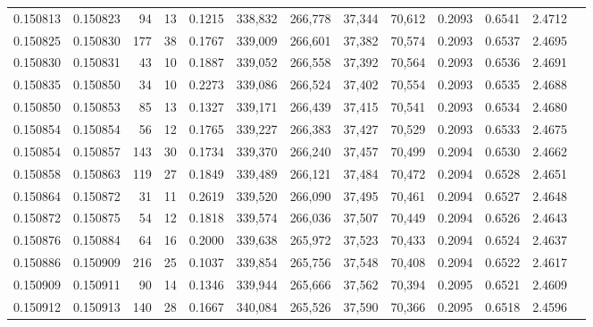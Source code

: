 \begin{tabular}{rrrrrrrrrrrrr}
0.150813 & 0.150823 &    94 &  13 &                                     0.1215 & 338,832 & 266,778 &  37,344 &  70,612 & 0.2093 & 0.6541 & 2.4712 \\
0.150825 & 0.150830 &   177 &  38 &                                     0.1767 & 339,009 & 266,601 &  37,382 &  70,574 & 0.2093 & 0.6537 & 2.4695 \\
0.150830 & 0.150831 &    43 &  10 &                                     0.1887 & 339,052 & 266,558 &  37,392 &  70,564 & 0.2093 & 0.6536 & 2.4691 \\
0.150835 & 0.150850 &    34 &  10 &                                     0.2273 & 339,086 & 266,524 &  37,402 &  70,554 & 0.2093 & 0.6535 & 2.4688 \\
0.150850 & 0.150853 &    85 &  13 &                                     0.1327 & 339,171 & 266,439 &  37,415 &  70,541 & 0.2093 & 0.6534 & 2.4680 \\
0.150854 & 0.150854 &    56 &  12 &                                     0.1765 & 339,227 & 266,383 &  37,427 &  70,529 & 0.2093 & 0.6533 & 2.4675 \\
0.150854 & 0.150857 &   143 &  30 &                                     0.1734 & 339,370 & 266,240 &  37,457 &  70,499 & 0.2094 & 0.6530 & 2.4662 \\
0.150858 & 0.150863 &   119 &  27 &                                     0.1849 & 339,489 & 266,121 &  37,484 &  70,472 & 0.2094 & 0.6528 & 2.4651 \\
0.150864 & 0.150872 &    31 &  11 &                                     0.2619 & 339,520 & 266,090 &  37,495 &  70,461 & 0.2094 & 0.6527 & 2.4648 \\
0.150872 & 0.150875 &    54 &  12 &                                     0.1818 & 339,574 & 266,036 &  37,507 &  70,449 & 0.2094 & 0.6526 & 2.4643 \\
0.150876 & 0.150884 &    64 &  16 &                                     0.2000 & 339,638 & 265,972 &  37,523 &  70,433 & 0.2094 & 0.6524 & 2.4637 \\
0.150886 & 0.150909 &   216 &  25 &                                     0.1037 & 339,854 & 265,756 &  37,548 &  70,408 & 0.2094 & 0.6522 & 2.4617 \\
0.150909 & 0.150911 &    90 &  14 &                                     0.1346 & 339,944 & 265,666 &  37,562 &  70,394 & 0.2095 & 0.6521 & 2.4609 \\
0.150912 & 0.150913 &   140 &  28 &                                     0.1667 & 340,084 & 265,526 &  37,590 &  70,366 & 0.2095 & 0.6518 & 2.4596 \\

\end{tabular}
